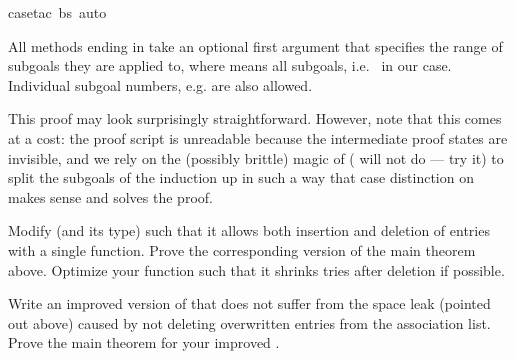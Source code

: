 \begin{isabellebody}
\isamarkuptrue%
\isamarkupfalse%
{\isacharparenleft}case{\isacharunderscore}tac{\isacharbrackleft}{\isacharbang}{\isacharbrackright}\ bs{\isacharcomma}\ auto{\isacharparenright}\isanewline
{}\isamarkupfalse%
%
\endisatagproof
{\isafoldproof}%
%
\isadelimproof
%
\endisadelimproof
%
\begin{isamarkuptext}%
\noindent
{}%
All methods ending in  take an optional first argument that
specifies the range of subgoals they are applied to, where \isa{{\isacharbrackleft}{\isacharbang}{\isacharbrackright}} means
all subgoals, i.e.\  in our case. Individual subgoal numbers,
e.g.  are also allowed.

This proof may look surprisingly straightforward. However, note that this
comes at a cost: the proof script is unreadable because the intermediate
proof states are invisible, and we rely on the (possibly brittle) magic of
 ( will not do --- try it) to split the subgoals
of the induction up in such a way that case distinction on  makes
sense and solves the proof. 

\begin{exercise}
  Modify  (and its type) such that it allows both insertion and
  deletion of entries with a single function.  Prove the corresponding version 
  of the main theorem above.
  Optimize your function such that it shrinks tries after
  deletion if possible.
\end{exercise}

\begin{exercise}
  Write an improved version of  that does not suffer from the
  space leak (pointed out above) caused by not deleting overwritten entries
  from the association list. Prove the main theorem for your improved
  .
\end{exercise}


\end{isamarkuptext}
\end{isabellebody}
